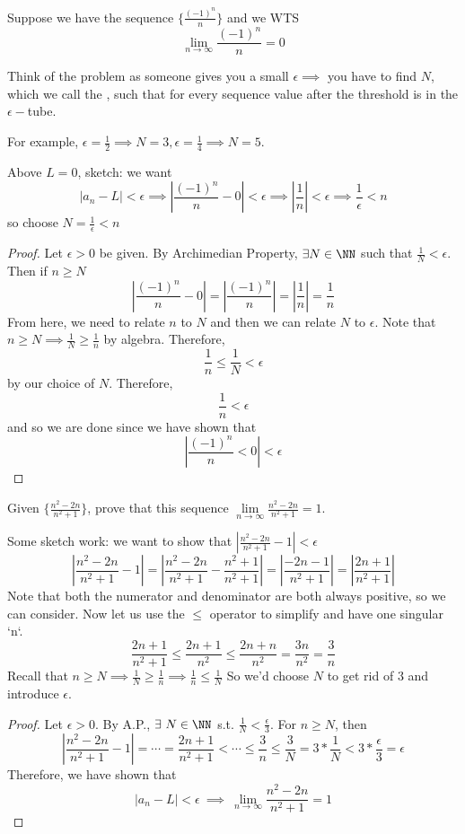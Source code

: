 \documentclass[12pt]{scrartcl}
\begin{document}
\begin{example}
  Suppose we have the sequence $\{\frac{(-1)^n}{n}\}$ and we WTS 
  \[\lim_{n\to\infty}\frac{(-1)^n}{n} = 0\]

  Think of the problem as someone gives you a small $\epsilon \implies$ you have to find $N$, 
  which we call the , such that for every sequence value after the threshold 
  is in the $\epsilon-$tube.

  For example, $\epsilon = \frac{1}{2} \implies N = 3, \epsilon = \frac{1}{4} \implies N = 5$.

  \hfill

  Above $L = 0$, sketch: we want 
  \[|a_n - L| < \epsilon \implies |\frac{(-1)^n}{n} - 0| < \epsilon \implies |\frac{1}{n}| < \epsilon \implies \frac{1}{\epsilon} < n\]
  so choose $N = \frac{1}{\epsilon} < n$

  \begin{proof}
    Let $\epsilon > 0$ be given. By Archimedian Property, $\exists N \in \NN$ such that 
    $\frac{1}{N} < \epsilon$. Then if $n \geq N$
    \[|\frac{(-1)^n}{n} - 0| = |\frac{(-1)^n}{n}| = |\frac{1}{n}| = \frac{1}{n}\]
    From here, we need to relate $n$ to $N$ and then we can relate $N$ to $\epsilon$. 
    Note that $n \geq N \implies \frac{1}{N} \geq \frac{1}{n}$ by algebra. Therefore, 
    \[\frac{1}{n} \leq \frac{1}{N} < \epsilon\]
    by our choice of $N$. Therefore, 
    \[\frac{1}{n} < \epsilon\] and 
    so we are done since we have shown that 
    \[|\frac{(-1)^n}{n} < 0| < \epsilon\]
  \end{proof}
\end{example}

\begin{example}
  Given $\{\frac{n^2 - 2n}{n^2 + 1}\}$, prove that this sequence $\underset{n\to\infty}{\lim}\frac{n^2 - 2n}{n^2 + 1} = 1$.

  Some sketch work: we want to show that $|\frac{n^2 - 2n}{n^2 + 1} - 1| < \epsilon$
  \[|\frac{n^2 - 2n}{n^2 + 1} - 1| = |\frac{n^2 - 2n}{n^2 + 1} - \frac{n^2 + 1}{n^2 + 1}| = |\frac{-2n - 1}{n^2 + 1}| = |\frac{2n + 1}{n^2 + 1}|\]
  Note that both the numerator and denominator are both always positive, so we can consider. 
  Now let us use the $\leq$ operator to simplify and have one singular `n`.
  \[\frac{2n+1}{n^2+1} \leq \frac{2n + 1}{n^2} \leq \frac{2n+n}{n^2} = \frac{3n}{n^2} = \frac{3}{n}\]
  Recall that $n \geq N \implies \frac{1}{N} \geq \frac{1}{n} \implies \frac{1}{n} \leq \frac{1}{N}$
  So we'd choose $N$ to get rid of $3$ and introduce $\epsilon$. 
  \begin{proof}
    Let $\epsilon > 0$. By A.P., $\exists \ N \in \NN$ s.t. $\frac{1}{N} < \frac{\epsilon}{3}$. 
    For $n \geq N$, then
    \[|\frac{n^2-2n}{n^2 + 1} - 1| = \cdots = \frac{2n + 1}{n^2 + 1} < \cdots \leq \frac{3}{n} \leq \frac{3}{N} = 3 * \frac{1}{N} < 3 * \frac{\epsilon}{3} = \epsilon\]
    Therefore, we have shown that
    \[|a_n - L| < \epsilon \ \implies \ \lim_{n\to\infty}\frac{n^2-2n}{n^2 + 1} = 1\]
  \end{proof}
\end{example}
\end{document}
